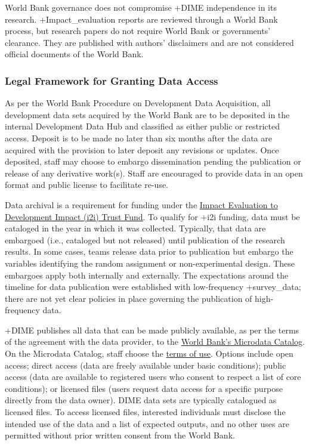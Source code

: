 \documentclass[
]{WileySix}
\begin{document}
World Bank governance does not compromise +DIME\textbar{} independence in its research. +Impact\_evaluation\textbar{} reports are reviewed through a World Bank process, but research papers do not require World Bank or governments' clearance. They are published with authors' disclaimers and are not considered official documents of the World Bank.

\hypertarget{legal-framework-for-granting-data-access-7}{%
\subsubsection{Legal Framework for Granting Data Access}\label{legal-framework-for-granting-data-access-7}}

As per the World Bank Procedure on Development Data Acquisition, all development data sets acquired by the World Bank are to be deposited in the internal Development Data Hub and classified as either public or restricted access. Deposit is to be made no later than six months after the data are acquired with the provision to later deposit any revisions or updates. Once deposited, staff may choose to embargo dissemination pending the publication or release of any derivative work(s). Staff are encouraged to provide data in an open format and public license to facilitate re-use.

Data archival is a requirement for funding under the \href{https://www.worldbank.org/en/research/dime/brief/i2i-fund}{Impact Evaluation to Development Impact (i2i) Trust Fund}. To qualify for +i2i\textbar{} funding, data must be cataloged in the year in which it was collected. Typically, that data are embargoed (i.e., cataloged but not released) until publication of the research results. In some cases, teams release data prior to publication but embargo the variables identifying the random assignment or non-experimental design. These embargoes apply both internally and externally. The expectations around the timeline for data publication were established with low-frequency +survey\_data\textbar; there are not yet clear policies in place governing the publication of high-frequency data.

+DIME\textbar{} publishes all data that can be made publicly available, as per the terms of the agreement with the data provider, to the \href{https://microdata.worldbank.org/index.php/home}{World Bank's Microdata Catalog}. On the Microdata Catalog, staff choose the \href{https://microdata.worldbank.org/index.php/terms-of-use}{terms of use}. Options include open access; direct access (data are freely available under basic conditions); public access (data are available to registered users who consent to respect a list of core conditions); or licensed files (users request data access for a specific purpose directly from the data owner). DIME data sets are typically catalogued as licensed files. To access licensed files, interested individuals must disclose the intended use of the data and a list of expected outputs, and no other uses are permitted without prior written consent from the World Bank.
\end{document}
